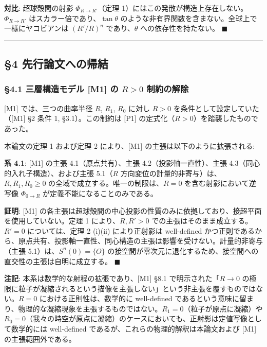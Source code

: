 \documentclass[
  a4paper]{ltjsarticle}
\begin{document}
\textbf{対比}: 超球殻間の射影 \(\Phi_{R \to R'}\)（定理
1）にはこの発散が構造上存在しない。\(\Phi_{R \to R'}\)
はスカラー倍であり、\(\tan\theta\)
のような非有界関数を含まない。全球上で一様にヤコビアンは \((R'/R)^n\)
であり、\(\theta\) への依存性を持たない。 \(\blacksquare\)

\begin{center}\rule{0.5\linewidth}{0.5pt}\end{center}

\subsection{§4
先行論文への帰結}\label{ux5148ux884cux8ad6ux6587ux3078ux306eux5e30ux7d50}

\subsubsection{\texorpdfstring{§4.1 三層構造モデル {[}M1{]} の \(R > 0\)
制約の解除}{§4.1 三層構造モデル {[}M1{]} の R \textgreater{} 0 制約の解除}}\label{ux4e09ux5c64ux69cbux9020ux30e2ux30c7ux30eb-m1-ux306e-r-0-ux5236ux7d04ux306eux89e3ux9664}

{[}M1{]} では、三つの曲率半径 \(R\), \(R_1\), \(R_0\) に対し \(R > 0\)
を条件として設定していた（{[}M1{]} §2 条件 1, §3.1）。この制約は
{[}P1{]} の定式化（\(R > 0\)）を踏襲したものであった。

本論文の定理 1 および定理 2 により、{[}M1{]}
の主張は以下のように拡張される:

\textbf{系 4.1}: {[}M1{]} の主張 4.1（原点共有）、主張
4.2（投影軸一直性）、主張 4.3（同心的入れ子構造）、および主張 5.1（\(R\)
方向変位の計量的非寄与）は、\(R, R_1, R_0 \geq 0\)
の全域で成立する。唯一の制限は、\(R = 0\) を含む射影において逆写像
\(\Phi_{0 \to R}\) が定義不能になることのみである。

\textbf{証明}: {[}M1{]}
の各主張は超球殻間の中心投影の性質のみに依拠しており、接超平面を使用していない。定理
1 により、\(R, R' > 0\) での主張はそのまま成立する。\(R' = 0\)
については、定理 2 (i)(ii) により正射影は well-defined
かつ正則であるから、原点共有、投影軸一直性、同心構造の主張は影響を受けない。計量的非寄与（主張
5.1）は、\(S^n(0) = \{O\}\)
の接空間が零次元に退化するため、接空間への直交性の主張は自明に成立する。
\(\blacksquare\)

\textbf{注記}: 本系は数学的な射程の拡張であり、{[}M1{]} §8.1
で明示された「\(R \to 0\)
の極限に粒子が凝縮されるという描像を主張しない」という非主張を覆すものではない。\(R = 0\)
における正則性は、数学的に well-defined
であるという意味に留まり、物理的な凝縮現象を主張するものではない。\(R_1 = 0\)（粒子が原点に凝縮）や
\(R_0 = 0\)（我々の時空が原点に凝縮）のケースにおいても、正射影は定値写像として数学的には
well-defined であるが、これらの物理的解釈は本論文および {[}M1{]}
の主張範囲外である。
\end{document}
